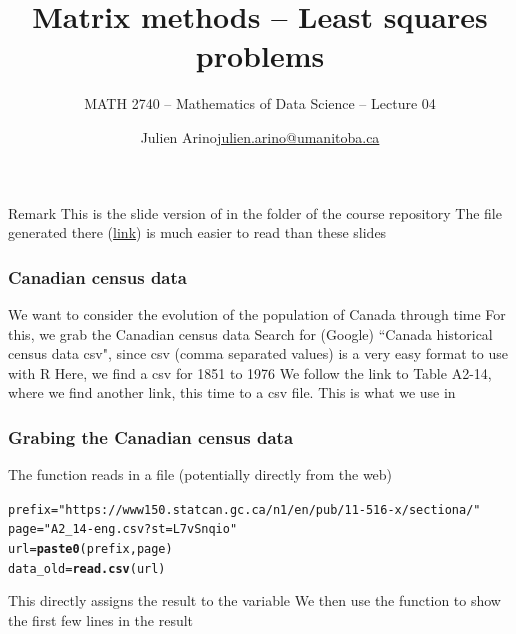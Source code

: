 \documentclass[aspectratio=169]{beamer}\usepackage[]{graphicx}\usepackage[]{xcolor}
\subtitle{MATH 2740 -- Mathematics of Data Science -- Lecture 04}
\author{\texorpdfstring{Julien Arino\newline\url{julien.arino@umanitoba.ca}}{Julien Arino}}
\institute{Department of Mathematics @ University of Manitoba}
\title{Matrix methods -- Least squares problems}
\makeatletter
\newcommand{\hlsng}[1]{\textcolor[rgb]{0.192,0.494,0.8}{#1}}%
\newcommand{\hldef}[1]{\textcolor[rgb]{0.345,0.345,0.345}{#1}}%
\newcommand{\hlkwb}[1]{\textcolor[rgb]{0.69,0.353,0.396}{#1}}%
\newcommand{\hlkwd}[1]{\textcolor[rgb]{0.737,0.353,0.396}{\textbf{#1}}}%
\newenvironment{kframe}{%
 \def\at@end@of@kframe{}%
 \ifinner\ifhmode%
  \def\at@end@of@kframe{\end{minipage}}%
  \begin{minipage}{\columnwidth}%
 \fi\fi%
 \def\FrameCommand##1{\hskip\@totalleftmargin \hskip-\fboxsep
 \colorbox{shadecolor}{##1}\hskip-\fboxsep
     \hskip-\linewidth \hskip-\@totalleftmargin \hskip\columnwidth}%
 \MakeFramed {\advance\hsize-\width
   \@totalleftmargin\z@ \linewidth\hsize
   \@setminipage}}%
 {\par\unskip\endMakeFramed%
 \at@end@of@kframe}
\newenvironment{knitrout}{}{} %
\makeatother
\begin{document}




\begin{frame}{Remark}
This is the slide version of  in the folder  of the course repository
\vfill
The  file generated there (\href{https://julien-arino.github.io/math-of-data-science/CODE/Canada-census-get-plot-data.html}{link}) is much easier to read than these slides
\end{frame}

\begin{frame}\frametitle{Canadian census data}
We want to consider the evolution of the population of Canada through time
\vfill
For this, we grab the Canadian census data
\vfill Search for (Google) ``Canada historical census data csv", since csv (comma separated values) is a very easy format to use with R
\vfill
Here, we find a csv for 1851 to 1976
\vfill
We follow the link to Table A2-14, where we find another link, this time to a csv file. This is what we use in 
\end{frame}


\begin{frame}[fragile]
\frametitle{Grabing the Canadian census data}
The function  reads in a file (potentially directly from the web)
\vfill
\begin{knitrout}
\color{fgcolor}\begin{kframe}
\begin{alltt}
\hldef{prefix} \hlkwb{=} \hlsng{"https://www150.statcan.gc.ca/n1/en/pub/11-516-x/sectiona/"}
\hldef{page} \hlkwb{=} \hlsng{"A2_14-eng.csv?st=L7vSnqio"}
\hldef{url} \hlkwb{=} \hlkwd{paste0}\hldef{(prefix, page)}
\hldef{data_old} \hlkwb{=} \hlkwd{read.csv}\hldef{(url)}
\end{alltt}
\end{kframe}
\end{knitrout}
\vfill
This directly assigns the result to the variable 
\vfill
We then use the function  to show the first few lines in the result
\end{frame}
\end{document}
